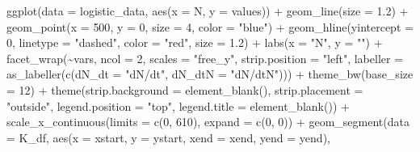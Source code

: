 \documentclass[
]{book}
\newenvironment{Shaded}{\begin{snugshade}}{\end{snugshade}}
\newcommand{\AttributeTok}[1]{\textcolor[rgb]{0.77,0.63,0.00}{#1}}
\newcommand{\DecValTok}[1]{\textcolor[rgb]{0.00,0.00,0.81}{#1}}
\newcommand{\FloatTok}[1]{\textcolor[rgb]{0.00,0.00,0.81}{#1}}
\newcommand{\FunctionTok}[1]{\textcolor[rgb]{0.00,0.00,0.00}{#1}}
\newcommand{\NormalTok}[1]{#1}
\newcommand{\SpecialCharTok}[1]{\textcolor[rgb]{0.00,0.00,0.00}{#1}}
\newcommand{\StringTok}[1]{\textcolor[rgb]{0.31,0.60,0.02}{#1}}
\begin{document}
\begin{Shaded}
\begin{Highlighting}[]
\FunctionTok{ggplot}\NormalTok{(}\AttributeTok{data =}\NormalTok{ logistic\_data, }\FunctionTok{aes}\NormalTok{(}\AttributeTok{x =}\NormalTok{ N, }\AttributeTok{y =}\NormalTok{ values)) }\SpecialCharTok{+} 
  \FunctionTok{geom\_line}\NormalTok{(}\AttributeTok{size =} \FloatTok{1.2}\NormalTok{) }\SpecialCharTok{+} 
  \FunctionTok{geom\_point}\NormalTok{(}\AttributeTok{x =} \DecValTok{500}\NormalTok{, }\AttributeTok{y =} \DecValTok{0}\NormalTok{, }\AttributeTok{size =} \DecValTok{4}\NormalTok{, }\AttributeTok{color =} \StringTok{"blue"}\NormalTok{) }\SpecialCharTok{+}
  \FunctionTok{geom\_hline}\NormalTok{(}\AttributeTok{yintercept =} \DecValTok{0}\NormalTok{, }\AttributeTok{linetype =} \StringTok{"dashed"}\NormalTok{, }\AttributeTok{color =} \StringTok{"red"}\NormalTok{, }\AttributeTok{size =} \FloatTok{1.2}\NormalTok{) }\SpecialCharTok{+}
  \FunctionTok{labs}\NormalTok{(}\AttributeTok{x =} \StringTok{"N"}\NormalTok{, }\AttributeTok{y =} \StringTok{""}\NormalTok{) }\SpecialCharTok{+}
  \FunctionTok{facet\_wrap}\NormalTok{(}\SpecialCharTok{\textasciitilde{}}\NormalTok{vars, }
             \AttributeTok{ncol =} \DecValTok{2}\NormalTok{, }
             \AttributeTok{scales =} \StringTok{"free\_y"}\NormalTok{,}
             \AttributeTok{strip.position =} \StringTok{"left"}\NormalTok{, }
             \AttributeTok{labeller =} \FunctionTok{as\_labeller}\NormalTok{(}\FunctionTok{c}\NormalTok{(}\AttributeTok{dN\_dt =} \StringTok{"dN/dt"}\NormalTok{, }
                                      \AttributeTok{dN\_dtN =} \StringTok{"dN/dtN"}\NormalTok{))) }\SpecialCharTok{+} 
  \FunctionTok{theme\_bw}\NormalTok{(}\AttributeTok{base\_size =} \DecValTok{12}\NormalTok{) }\SpecialCharTok{+}
  \FunctionTok{theme}\NormalTok{(}\AttributeTok{strip.background =} \FunctionTok{element\_blank}\NormalTok{(),}
        \AttributeTok{strip.placement =} \StringTok{"outside"}\NormalTok{,}
        \AttributeTok{legend.position =} \StringTok{"top"}\NormalTok{,}
        \AttributeTok{legend.title =} \FunctionTok{element\_blank}\NormalTok{()) }\SpecialCharTok{+} 
  \FunctionTok{scale\_x\_continuous}\NormalTok{(}\AttributeTok{limits =} \FunctionTok{c}\NormalTok{(}\DecValTok{0}\NormalTok{, }\DecValTok{610}\NormalTok{), }\AttributeTok{expand =} \FunctionTok{c}\NormalTok{(}\DecValTok{0}\NormalTok{, }\DecValTok{0}\NormalTok{)) }\SpecialCharTok{+} 
  \FunctionTok{geom\_segment}\NormalTok{(}\AttributeTok{data =}\NormalTok{ K\_df, }
               \FunctionTok{aes}\NormalTok{(}\AttributeTok{x =}\NormalTok{ xstart, }\AttributeTok{y =}\NormalTok{ ystart, }\AttributeTok{xend =}\NormalTok{ xend, }\AttributeTok{yend =}\NormalTok{ yend), }

\end{Highlighting}
\end{Shaded}
\end{document}
